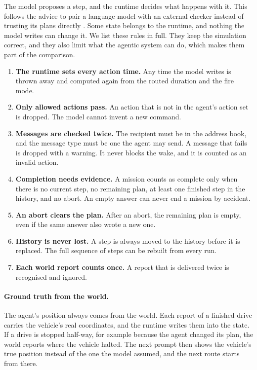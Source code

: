 The model proposes a step, and the runtime decides what happens with it. This
follows the advice to pair a language model with an external checker instead of
trusting its plans directly \parencite{kambhampati2024}. Some
state belongs to the runtime, and nothing the model writes can change it. We
list these rules in full. They keep the simulation correct, and they also limit
what the agentic system can do, which makes them part of the comparison.

\begin{enumerate}
  \item \textbf{The runtime sets every action time.} Any time the model writes
  is thrown away and computed again from the routed duration and the fire mode.
  \item \textbf{Only allowed actions pass.} An action that is not in the
  agent's action set is dropped. The model cannot invent a new command.
  \item \textbf{Messages are checked twice.} The recipient must be in the
  address book, and the message type must be one the agent may send. A message
  that fails is dropped with a warning. It never blocks the wake, and it is
  counted as an invalid action.
  \item \textbf{Completion needs evidence.} A mission counts as complete only
  when there is no current step, no remaining plan, at least one finished step
  in the history, and no abort. An empty answer can never end a mission by
  accident.
  \item \textbf{An abort clears the plan.} After an abort, the remaining plan
  is empty, even if the same answer also wrote a new one.
  \item \textbf{History is never lost.} A step is always moved to the history
  before it is replaced. The full sequence of steps can be rebuilt from every
  run.
  \item \textbf{Each world report counts once.} A report that is delivered
  twice is recognised and ignored.
\end{enumerate}

\paragraph{Ground truth from the world.} The agent's position always comes from
the world. Each report of a finished drive carries the vehicle's real
coordinates, and the runtime writes them into the state. If a drive is stopped
half-way, for example because the agent changed its plan, the world reports
where the vehicle halted. The next prompt then shows the vehicle's true
position instead of the one the model assumed, and the next route starts from
there.

